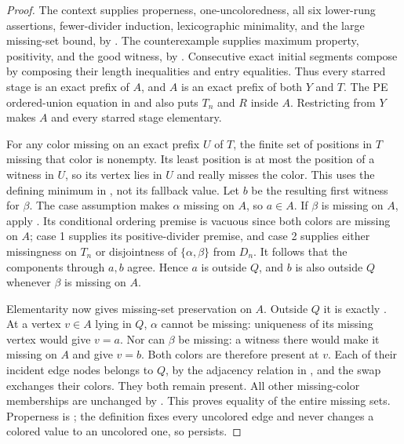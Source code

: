 \begin{proof}
The context supplies properness, one-uncoloredness, all six lower-rung
assertions, fewer-divider induction, lexicographic minimality, and the
large missing-set bound, by
.  The counterexample supplies
maximum property, positivity, and the good witness, by
.  Consecutive exact initial segments
compose by composing their length inequalities and entry equalities.
Thus every starred stage is an exact prefix of $A$, and $A$ is an exact
prefix of both $Y$ and $T$.  The PE ordered-union equation in
 and  also puts $T_n$
and $R$ inside $A$.  Restricting
 from $Y$ makes $A$ and every starred
stage elementary.

For any color missing on an exact prefix $U$ of $T$, the finite set of
positions in $T$ missing that color is nonempty.  Its least position is
at most the position of a witness in $U$, so its vertex lies in $U$ and
really misses the color.  This uses the defining minimum in
, not its fallback value.
Let $b$ be the resulting first witness for $\beta$.  The case assumption
makes $\alpha$ missing on $A$, so $a\in A$.  If $\beta$ is missing on $A$,
apply .  Its conditional ordering premise
is vacuous since both colors are missing on $A$; case 1 supplies its
positive-divider premise, and case 2 supplies either missingness on
$T_n$ or disjointness of $\{\alpha,\beta\}$ from $D_n$.
It follows that the components through $a,b$ agree.  Hence $a$ is outside
$Q$, and $b$ is also outside $Q$ whenever $\beta$ is missing on $A$.

Elementarity now gives missing-set preservation on $A$.  Outside $Q$ it
is exactly .  At a vertex
$v\in A$ lying in $Q$, $\alpha$ cannot be missing: uniqueness of its
missing vertex would give $v=a$.  Nor can $\beta$ be missing: a witness
there would make it missing on $A$ and give $v=b$.  Both colors are
therefore present at $v$.  Each of their incident edge nodes belongs to
$Q$, by the adjacency relation in , and
the swap exchanges their colors.  They both remain present.  All other
missing-color memberships are unchanged by
.  This proves equality of
the entire missing sets.  Properness is
; the definition
 fixes every uncolored edge and never
changes a colored value to an uncolored one, so
 persists.


\end{proof}
